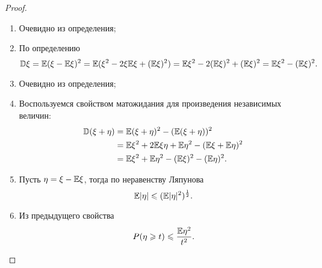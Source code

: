 \begin{proof}
\begin{enumerate}
   \item Очевидно из определения;
   \item По определению
   $$\mathbb{D} \xi = \mathbb{E} (\xi - \mathbb{E} \xi)^2 = \mathbb{E} (\xi^2 - 2\xi \mathbb{E} \xi + (\mathbb{E} \xi)^2) = \mathbb{E} \xi^2 - 2(\mathbb{E} \xi)^2 + (\mathbb{E} \xi)^2 = \mathbb{E} \xi^2 - (\mathbb{E} \xi)^2.$$

   \item      Очевидно из определения;            
            

   \item Воспользуемся свойством матожидания для произведения независимых величин:
   \begin{align*}
       \mathbb{D} (\xi+\eta) &= \mathbb{E} (\xi +\eta)^2 - (\mathbb{E} (\xi +\eta))^2 \\&= \mathbb{E} \xi^2 + 2\mathbb{E} \xi\eta + \mathbb{E} \eta^2 - (\mathbb{E} \xi + \mathbb{E} \eta)^2 \\&= \mathbb{E} \xi^2 + \mathbb{E} \eta^2 - (\mathbb{E} \xi)^2 - (\mathbb{E} \eta)^2.
   \end{align*}
                  
           
              
   
           
       \item Пусть $\eta =\xi - \mathbb{E} \xi$, тогда по неравенству Ляпунова
       $$\mathbb{E} \lvert\eta\rvert \leqslant (\mathbb{E} \lvert\eta\rvert^2)^\frac{1}{2}.$$
             
             
       \item Из предыдущего свойства
                   $$P(\eta\geqslant t) \leqslant \frac{\mathbb{E} \eta^2}{t^2}.$$ \qedhere
                   \end{enumerate}
              \end{proof}
